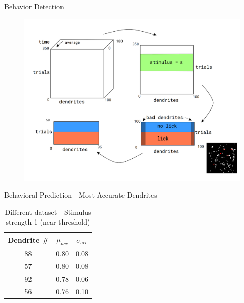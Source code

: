 \documentclass[10pt]{beamer}
\begin{document}


\begin{frame}[fragile]{Behavior Detection}
\begin{center}
	\begin{figure}
      \includegraphics[width=1.0\textwidth]{data_hm.png}
	\end{figure}
	\end{center}
\end{frame}

\begin{frame}[fragile]{Behavioral Prediction - Most Accurate Dendrites}
\begin{table}
    \caption*{Different dataset - Stimulus strength 1 (near threshold)}
    \begin{tabular}{c|c|c}
      \toprule
      Dendrite \# & $\mu_{acc}$ & $\sigma_{acc}$\\
      \midrule
      88 & 0.80 & 0.08\\
      57 & 0.80 & 0.08\\
      92 & 0.78 & 0.06\\
      56 & 0.76 & 0.10\\
      \bottomrule
    \end{tabular}
  \end{table}
\end{frame}
\end{document}

